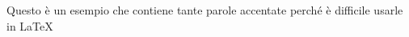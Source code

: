 \documentclass[a4paper,12pt]{book}
\begin{document}
Questo è un esempio che contiene tante parole accentate perché è difficile usarle in \LaTeX




\end{document}
